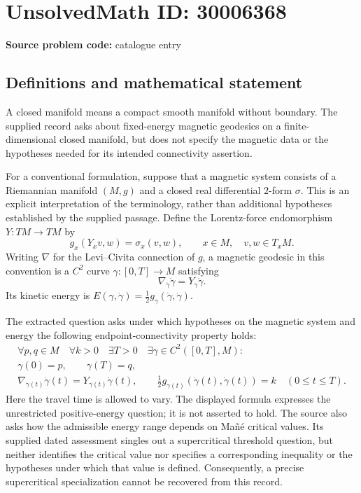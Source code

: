 \documentclass[11pt]{article}
\begin{document}
\section*{UnsolvedMath ID: 30006368}
\textbf{Source problem code:} catalogue entry
\subsection{Definitions and mathematical statement}
A closed manifold means a compact smooth manifold without boundary. The supplied record asks about fixed-energy magnetic geodesics on a finite-dimensional closed manifold, but does not specify the magnetic data or the hypotheses needed for its intended connectivity assertion.

For a conventional formulation, suppose that a magnetic system consists of a Riemannian manifold \((M,g)\) and a closed real differential \(2\)-form \(\sigma\). This is an explicit interpretation of the terminology, rather than additional hypotheses established by the supplied passage. Define the Lorentz-force endomorphism \(Y:TM\to TM\) by
\[
 g_x(Y_xv,w)=\sigma_x(v,w),\qquad x\in M,\quad v,w\in T_xM.
\]
Writing \(\nabla\) for the Levi--Civita connection of \(g\), a magnetic geodesic in this convention is a \(C^2\) curve \(\gamma:[0,T]\to M\) satisfying
\[
 \nabla_{\dot\gamma}\dot\gamma=Y_{\gamma}\dot\gamma.
\]
Its kinetic energy is \(E(\gamma,\dot\gamma)=\tfrac12 g_{\gamma}(\dot\gamma,\dot\gamma)\).

The extracted question asks under which hypotheses on the magnetic system and energy the following endpoint-connectivity property holds:
\[
 \begin{gathered}
 \forall p,q\in M\quad \forall k>0\quad
 \exists T>0\quad \exists\gamma\in C^2([0,T],M):\\
 \gamma(0)=p,\qquad \gamma(T)=q,\\
 \nabla_{\dot\gamma(t)}\dot\gamma(t)=Y_{\gamma(t)}\dot\gamma(t),\qquad
 \tfrac12 g_{\gamma(t)}(\dot\gamma(t),\dot\gamma(t))=k
 \quad(0\le t\le T).
 \end{gathered}
\]
Here the travel time is allowed to vary. The displayed formula expresses the unrestricted positive-energy question; it is not asserted to hold. The source also asks how the admissible energy range depends on Ma\~n\'e critical values. Its supplied dated assessment singles out a supercritical threshold question, but neither identifies the critical value nor specifies a corresponding inequality or the hypotheses under which that value is defined. Consequently, a precise supercritical specialization cannot be recovered from this record.
\end{document}
